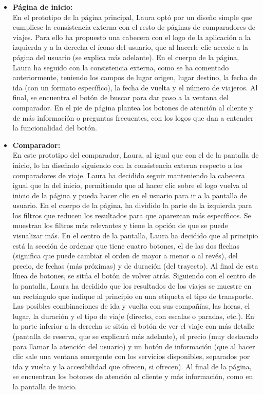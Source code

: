 \begin{itemize}
    \item\textbf{Página de inicio:} \\ En el prototipo de la página principal, Laura optó por un diseño simple que cumpliese la consistencia externa con el resto de páginas de comparadores de viajes. Para ello ha propuesto una cabecera con el logo de la aplicación a la izquierda y a la derecha el ícono del usuario, que al hacerle clic accede a la página del usuario (se explica más adelante). 
    En el cuerpo de la página, Laura ha seguido con la consistencia externa, como se ha comentado anteriormente, teniendo los campos de lugar origen, lugar destino, la fecha de ida (con un formato específico), la fecha de vuelta y el número de viajeros. Al final, se encuentra el botón de buscar para dar paso a la ventana del comparador.
    En el pie de página plantea los botones de atención al cliente y de más información o preguntas frecuentes, con los logos que dan a entender la funcionalidad del botón.
    
    \item\textbf{Comparador:} \\ 

    En este prototipo del comparador, Laura, al igual que con el de la pantalla de inicio, lo ha diseñado siguiendo con la consistencia externa respecto a los comparadores de viaje.
    Laura ha decidido seguir manteniendo la cabecera igual que la del inicio, permitiendo que al hacer clic sobre el logo vuelva al inicio de la página y pueda hacer clic en el usuario para ir a la pantalla de usuario.
    En el cuerpo de la página, ha dividido la parte de la izquierda para los filtros que reducen los resultados para que aparezcan más específicos. Se muestran los filtros más relevantes y tiene la opción de que se puede visualizar más.
    En el centro de la pantalla, Laura ha decidido que al principio está la sección de ordenar que tiene cuatro botones, el de las dos flechas (significa que puede cambiar el orden de mayor a menor o al revés), del precio, de fechas (más próximas) y de duración (del trayecto). Al final de esta línea de botones, se sitúa el botón de volver atrás.
    Siguiendo con el centro de la pantalla, Laura ha decidido que los resultados de los viajes se muestre en un rectángulo que indique al principio en una etiqueta el tipo de transporte. Las posibles combinaciones de ida y vuelta con sus compañías, las horas, el lugar, la duración y el tipo de viaje (directo, con escalas o paradas, etc.). En la parte inferior a la derecha se sitúa el botón de ver el viaje con más detalle (pantalla de reserva, que se explicará más adelante), el precio (muy destacado para llamar la atención del usuario) y un botón de información (que al hacer clic sale una ventana emergente con los servicios disponibles, separados por ida y vuelta y la accesibilidad que ofrecen, si ofrecen).
    Al final de la página, se encuentran los botones de atención al cliente y más información, como en la pantalla de inicio.
    

\end{itemize}
